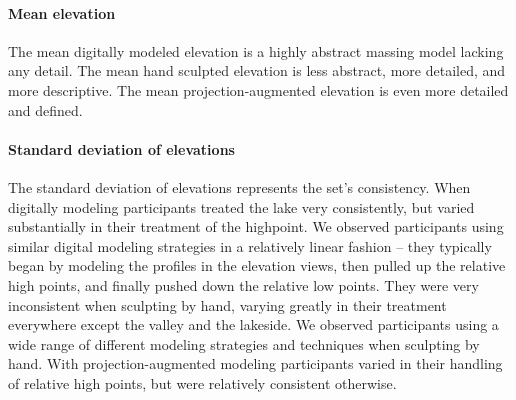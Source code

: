 \documentclass[prodmode,acmtochi]{acmsmall} %
\begin{document}

% 
%


\paragraph{Mean elevation}
The mean digitally modeled elevation is a highly abstract massing model
lacking any detail. 
% 
The mean hand sculpted elevation 
is less abstract, more detailed, and more descriptive.
%
The mean projection-augmented elevation 
is even more detailed and defined. 

\paragraph{Standard deviation of elevations}
The standard deviation of elevations represents the set's consistency.
%
When digitally modeling 
participants treated the lake very consistently, but 
varied substantially in their treatment of the highpoint.
%
We observed participants 
using similar digital modeling strategies 
in a relatively linear fashion -- 
they typically began by modeling the profiles in the elevation views,
then pulled up the relative high points, 
and finally pushed down the relative low points. 
They were very inconsistent 
when sculpting by hand,
varying greatly in their treatment 
everywhere except the valley and the lakeside.
%
We observed participants using 
a wide range of different modeling strategies
and techniques
when sculpting by hand. 
%
With projection-augmented modeling 
participants varied in their handling of relative high points, 
but were relatively consistent otherwise. 
\end{document}

